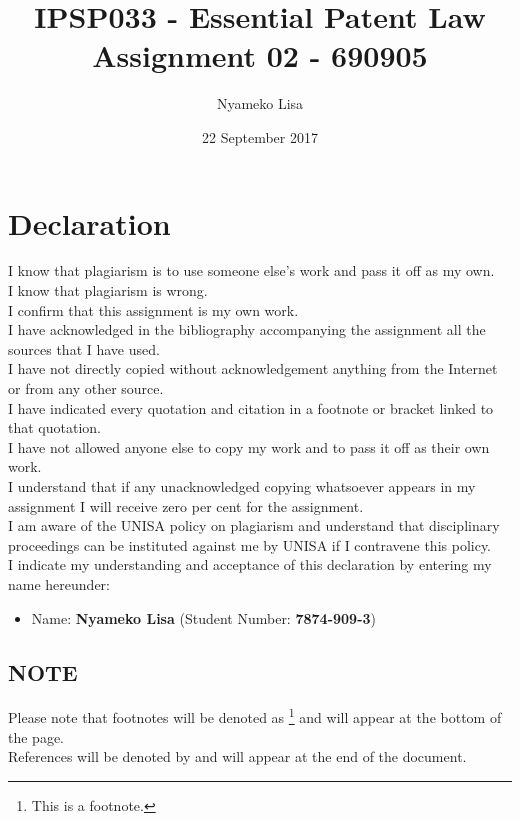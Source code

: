\documentclass[11pt]{article}
\author{Nyameko Lisa}
\date{22 September 2017}
\title{IPSP033 - Essential Patent Law\\\medskip
\large Assignment 02 - 690905}
\begin{document}
\maketitle
\addvspace{110pt}

\justifying
\addvspace{110pt}
\section*{Declaration}
\label{sec:org1679f38}
I know that plagiarism is to use someone else’s work and pass it off as my own.\\
I know that plagiarism is wrong.\\
I confirm that this assignment is my own work.\\
I have acknowledged in the bibliography accompanying the assignment all the sources that I have used.\\
I have not directly copied without acknowledgement anything from the Internet or from any other source.\\
I have indicated every quotation and citation in a footnote or bracket linked to that quotation.\\
I have not allowed anyone else to copy my work and to pass it off as their own work.\\
I understand that if any unacknowledged copying whatsoever appears in my assignment I will receive zero per cent for the assignment.\\
I am aware of the UNISA policy on plagiarism and understand that disciplinary proceedings can be instituted against me by UNISA if I contravene this policy.\\
I indicate my understanding and acceptance of this declaration by
entering my name hereunder:
\begin{itemize}
\item Name: \textbf{Nyameko Lisa} (Student Number: \textbf{7874-909-3})
\end{itemize}

\subsection*{NOTE}
\label{sec:orgf59e384}
Please note that footnotes will be denoted as \footnote{This is a footnote.} and will
appear at the bottom of the page.\\
References will be denoted by \cite{rsa78_patents_act} and will appear at the end of the document.
\newpage
\end{document}
